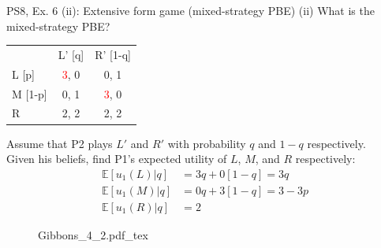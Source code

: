 \begin{frame}{PS8, Ex. 6 (ii): Extensive form game (mixed-strategy PBE)}
    (ii) What is the mixed-strategy PBE? \vspace{-8pt}
    \begin{multicols}{2}
      \begin{table}
        \begin{tabular}{l|c|c|}
          \multicolumn{1}{c}{} & \multicolumn{1}{c}{L' [q]} & \multicolumn{1}{c}{R' [1-q]} \\\cline{2-3}
          L [p]   & \textcolor{red}{3}, 0 & 0, \color{blue}1 \\\cline{2-3}
          M [1-p] & 0, \color{blue}1 & \textcolor{red}{3}, 0 \\\cline{2-3}
          R       & 2, \color{blue}2 & 2, \color{blue}2 \\\cline{2-3}
        \end{tabular}
      \end{table} \vspace{-4pt}
      Assume that P2 plays $L'$ and $R'$ with probability $q$ and $1-q$ respectively.\\\smallskip
      Given his beliefs, find P1's expected utility of $L$, $M$, and $R$ respectively: \vspace{-4pt}
      \begin{align*}
        \mathbb{E}[u_1(L)|q]&=3q+0[1-q]=3q\\
        \mathbb{E}[u_1(M)|q]&=0q+3[1-q]=3-3p\\
        \mathbb{E}[u_1(R)|q]&=2
      \end{align*}
      \vfill\null\columnbreak
      \begin{figure}[!h]
        \center {}
        {Gibbons_4_2.pdf_tex}
      \end{figure}
      \vfill\null
    \end{multicols}
\end{frame}
